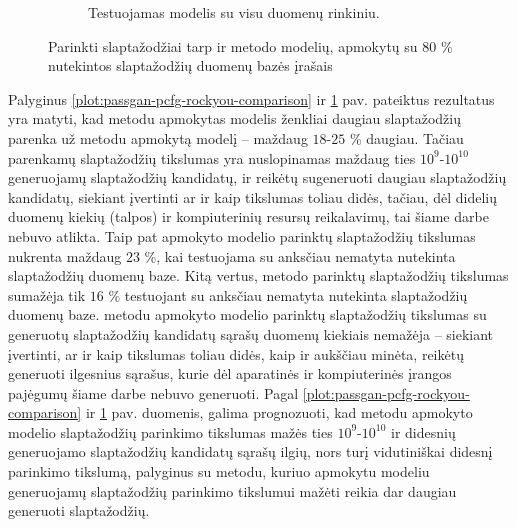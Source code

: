 \documentclass{VUMIFInfBakalaurinis}
\begin{document}
\begin{figure}[H]
\begin{subfigure}{.5\textwidth}
    \caption{Testuojamas modelis su visu  duomenų rinkiniu.}
    \label{plot:passgan-pcfg-linkedin-comparison}
  \end{subfigure}
  \caption{%
    Parinkti slaptažodžiai tarp  ir  metodo 
    modelių, apmokytų su $80$ \%  nutekintos slaptažodžių 
    duomenų bazės įrašais
  }
  \label{plot:passgan-pcfg-comparison}
\end{figure}%
Palyginus \ref{plot:passgan-pcfg-rockyou-comparison} ir 
\ref{plot:passgan-pcfg-linkedin-comparison} pav. pateiktus rezultatus yra 
matyti, kad  metodu apmokytas modelis ženkliai daugiau 
slaptažodžių parenka už  metodu apmokytą modelį -- maždaug 
$18$-$25$ \% daugiau. Tačiau parenkamų slaptažodžių tikslumas yra nuslopinamas 
maždaug ties $10^9$-$10^{10}$ generuojamų slaptažodžių kandidatų, ir reikėtų 
sugeneruoti daugiau slaptažodžių kandidatų, siekiant įvertinti ar ir kaip 
tikslumas toliau didės, tačiau, dėl didelių duomenų kiekių (talpos) ir 
kompiuterinių resursų reikalavimų, tai šiame darbe nebuvo atlikta. Taip pat 
 apmokyto modelio parinktų slaptažodžių tikslumas nukrenta 
maždaug $23$ \%, kai testuojama su anksčiau nematyta nutekinta slaptažodžių 
duomenų baze. Kitą vertus,  metodo parinktų slaptažodžių 
tikslumas sumažėja tik $16$ \% testuojant su anksčiau nematyta nutekinta 
slaptažodžių duomenų baze.  metodu apmokyto modelio parinktų 
slaptažodžių tikslumas su generuotų slaptažodžių kandidatų sąrašų duomenų 
kiekiais nemažėja -- siekiant įvertinti, ar ir kaip tikslumas toliau didės, kaip 
ir aukščiau minėta, reikėtų generuoti ilgesnius sąrašus, kurie dėl aparatinės ir 
kompiuterinės įrangos pajėgumų šiame darbe nebuvo generuoti. Pagal 
\ref{plot:passgan-pcfg-rockyou-comparison} ir 
\ref{plot:passgan-pcfg-linkedin-comparison} pav. duomenis, galima prognozuoti, 
kad  metodu apmokyto modelio slaptažodžių parinkimo tikslumas 
mažės ties $10^9$-$10^{10}$ ir didesnių generuojamo slaptažodžių kandidatų 
sąrašų ilgių, nors turį vidutiniškai didesnį parinkimo tikslumą, palyginus su 
 metodu, kuriuo apmokytu modeliu generuojamų slaptažodžių 
parinkimo tikslumui mažėti reikia dar daugiau generuoti slaptažodžių.
\end{document}
